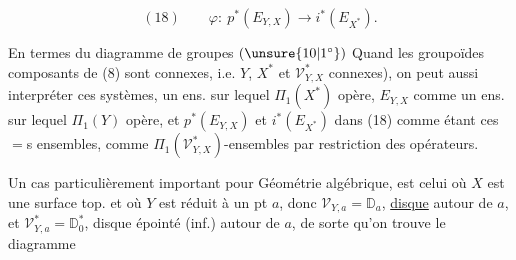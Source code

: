 
\[
(18)\qquad \varphi:\ p^*(E_{Y,X})\longrightarrow i^*(E_{X^*}).
\]

En termes du diagramme de groupes
$(\unsure{10|1^\circ})$ Quand les  groupoïdes composants de
(8) sont connexes, i.e. $Y$, $X^*$ et $\mathcal V^*_{Y,X}$
connexes), on peut aussi interpréter
ces systèmes, 
un ens. sur lequel $\Pi_1(X^*)$ opère, $E_{Y,X}$
comme un ens. sur lequel $\Pi_1(Y)$ opère,
et $p^*(E_{Y,X})$ et $i^*(E_{X^*})$ dans (18) comme
étant ces $=$s ensembles,  comme
$\Pi_1(\mathcal V^*_{Y,X})$-ensembles  par restriction
des opérateurs.


Un cas  particulièrement important
pour   Géométrie algébrique,
est celui où $X$ est une surface
top. et où $Y$ est réduit à un pt $a$,
donc $\mathcal V_{Y,a}=\mathbb D_a$, \uline{disque}  autour de $a$,
et $\mathcal V^*_{Y,a}=\mathbb D^*_0$, disque épointé (inf.) autour
de $a$, de sorte qu'on trouve le diagramme

